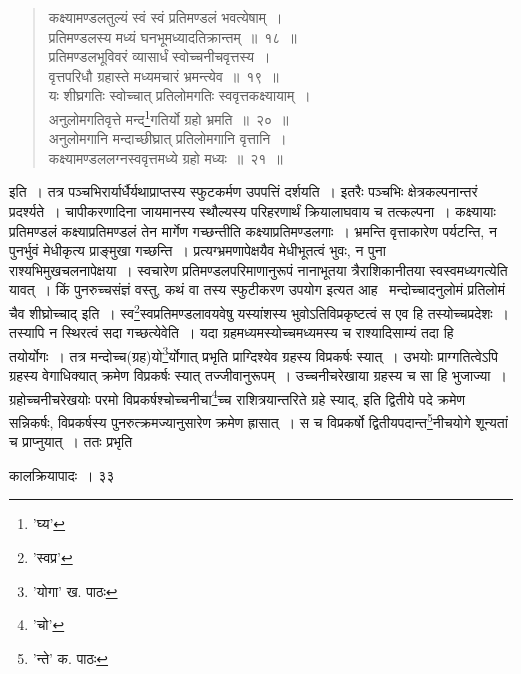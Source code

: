 \documentclass[11pt, openany]{book}
\begin{document}
{{{{\begin{quote}
{\ab कक्ष्यामण्डलतुल्यं स्वं स्वं प्रतिमण्डलं भवत्येषाम्~।\\
प्रतिमण्डलस्य मध्यं घनभूमध्यादतिक्रान्तम्~॥~१८~॥\\
प्रतिमण्डलभूविवरं व्यासार्धं स्वोच्चनीचवृत्तस्य~।\\
वृत्तपरिधौ ग्रहास्ते मध्यमचारं भ्रमन्त्येव~॥~१९~॥\\
यः शीघ्रगतिः स्वोच्चात् प्रतिलोमगतिः स्ववृत्तकक्ष्यायाम्~।\\
अनुलोमगतिवृत्ते मन्द\renewcommand{\thefootnote}{१}\footnote{'घ्य'}गतिर्यो ग्रहो भ्रमति~॥~२०~॥\\
अनुलोमगानि मन्दाच्छीघ्रात् प्रतिलोमगानि वृत्तानि~।\\
कक्ष्यामण्डललग्नस्ववृत्तमध्ये ग्रहो मध्यः~॥~२१~॥ }
\end{quote}

\noindent इति~। तत्र पञ्चभिरार्यार्धैर्यथाप्राप्तस्य स्फुटकर्मण उपपत्तिं दर्शयति~। इतरैः पञ्चभिः क्षेत्रकल्पनान्तरं प्रदर्श्यते~। चापीकरणादिना जायमानस्य स्थौल्यस्य परिहरणार्थं क्रियालाघवाय च तत्कल्पना~। कक्ष्यायाः प्रतिमण्डलं कक्ष्याप्रतिमण्डलं तेन मार्गेण गच्छन्तीति
कक्ष्याप्रतिमण्डलगाः~। भ्रमन्ति वृत्ताकारेण पर्यटन्ति, न पुनर्भुवं मेधीकृत्य प्राङ्मुखा गच्छन्ति~। प्रत्यग्भ्रमणापेक्षयैव मेधीभूतत्वं भुवः, न पुना राश्यभिमुखचलनापेक्षया~। स्वचारेण प्रतिमण्डलपरिमाणानुरूपं नानाभूतया त्रैराशिकानीतया स्वस्वमध्यगत्येति यावत्~। किं पुनरुच्चसंज्ञं वस्तु, कथं वा तस्य स्फुटीकरण उपयोग इत्यत आह \textendash\ मन्दोच्चादनुलोमं प्रतिलोमं चैव शीघ्रोच्चाद् इति~। स्व\renewcommand{\thefootnote}{२}\footnote{'स्वप्र'}स्वप्रतिमण्डलावयवेषु यस्यांशस्य भुवोऽतिविप्रकृष्टत्वं स
एव हि तस्योच्चप्रदेशः~। तस्यापि न स्थिरत्वं सदा गच्छत्येवेति~। यदा ग्रहमध्यमस्योच्चमध्यमस्य च राश्यादिसाम्यं तदा हि तयोर्योगः~। तत्र मन्दोच्च(ग्रह)यो\renewcommand{\thefootnote}{३}\footnote{'योगा' ख. पाठः}र्योगात् प्रभृति प्राग्दिश्येव ग्रहस्य विप्रकर्षः स्यात्~। उभयोः प्राग्गतित्वेऽपि ग्रहस्य वेगाधिक्यात् क्रमेण विप्रकर्षः स्यात् तज्जीवानुरूपम्~। उच्चनीचरेखाया ग्रहस्य च सा हि भुजाज्या~। ग्रहोच्चनीचरेखयोः परमो विप्रकर्षश्चोच्चनीचा\renewcommand{\thefootnote}{४}\footnote{'चो'}च्च राशित्रयान्तरिते ग्रहे स्याद्, इति द्वितीये पदे क्रमेण सन्निकर्षः, विप्रकर्षस्य पुनरुत्क्रमज्यानुसारेण क्रमेण ह्रासात्~। स च विप्रकर्षो द्वितीयपदान्त\renewcommand{\thefootnote}{५}\footnote{'न्ते' क. पाठः}नीचयोगे शून्यतां च प्राप्नुयात्~। ततः
प्रभृति
\newpage

\vspace{3cm} \hspace{4cm}कालक्रियापादः~। \hspace{4cm}३३

}}}}
\end{document}
